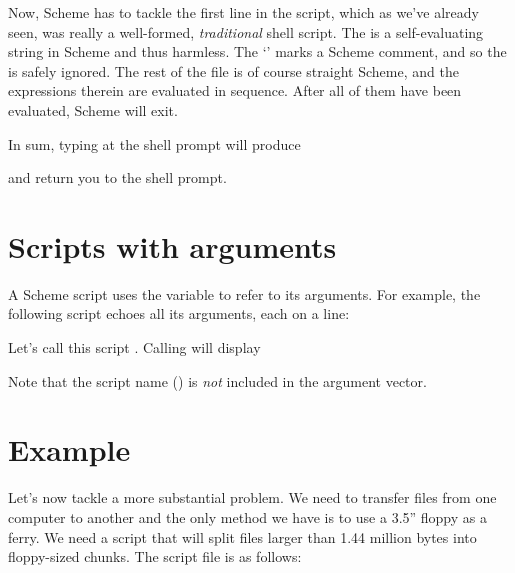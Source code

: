 Now, Scheme has to tackle the first line in the script,
which as we’ve already seen, was really a well-formed,
{\em traditional} shell script.  The  is a
self-evaluating string in Scheme and thus harmless.
The
‘\p{;}’ marks a Scheme comment, and so the  is
safely ignored.  The rest of the file is of course
straight Scheme, and the expressions therein are
evaluated in sequence.  After all of them have been
evaluated, Scheme will exit.

In sum, typing  at the shell prompt will produce


\n and return you to the shell prompt.

\section{Scripts with arguments}

A Scheme script uses the variable  to refer to
its arguments.  For example, the following script
echoes all its arguments, each on a line:


Let’s call this script .  Calling  will display


\n Note that the script name () is {\em not} included in
the argument vector.

\section{Example}

Let’s now tackle a more substantial problem.  We need
to transfer files from one computer to another and the
only method we have is to use a 3.5'' floppy as a
ferry.  We need a script  that will
split files larger than 1.44 million bytes into
floppy-sized chunks.  The script file 
is as follows:

